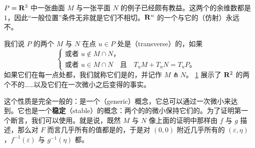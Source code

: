 \begin{figure}[htbp]
\centering
{}
\caption{}\label{fig:transversality-deformation}
\end{figure}

\begin{example}\label{thm:surface-plane-example}
$P=\mathbf{R}^{3}$ 中一张曲面 $M$ 与一张平面 $N$ 的例子已经颇有教益。这两个\trSubmanifold{}的余维数都是 $1$，因此“一般位置”条件无非就是它们不相切。$\mathbf{R}^{n}$ 的一个\trSubmanifold{}与它的（仿射）\trTangentSpace{}永远不\trTransverse。
\end{example}

我们说 $P$ 的两个\trSubmanifold{} $M$ 与 $N$ 在点 $u\in P$ 处是\textbf{\trTransverse}（transverse）的，如果
\[
\begin{cases}
\text{或者 }u\notin M\cap N\text{，}\\
\text{或者 }u\in M\cap N\quad\text{且}\quad T_{u}M+T_{u}N=T_{u}P\text{。}
\end{cases}
\]
如果它们在每一点处都\trTransverse，我们就称它们是\trTransverse{}的，并记作 $M\pitchfork N$。
\cref{fig:transversality-deformation} 展示了 $\mathbf{R}^{2}$ 的两个不\trTransverse{}的\trSubmanifold……以及它们在一次微小\trDeformation{}之后变得\trTransverse{}的事实。

\begin{remark}\label{thm:transversality-generic-stable}
这个性质是完全一般的：\trTransversality{}是一个\textbf{\trGeneric}（generic）概念，它总可以通过一次微小\trDeformation{}来达到。它也是一个\textbf{稳定}（stable）的概念：两个\trTransverse{}的\trSubmanifold{}的微小\trDeformation{}保持它们的\trTransversality。为了证明第一个断言，我们可以使用\trSardTheorem。就是说，既然 $M$ 与 $N$ 像上面的证明中那样由\trSubmersion{} $f$ 与 $g$ 描述，那么对 $F$ 而言几乎所有的值都是\trRegular{}的，于是对 $(0,0)$ 附近几乎所有的 $(\varepsilon,\eta)$，$f^{-1}(\varepsilon)$ 与 $g^{-1}(\eta)$ 都\trTransverse。
\end{remark}

